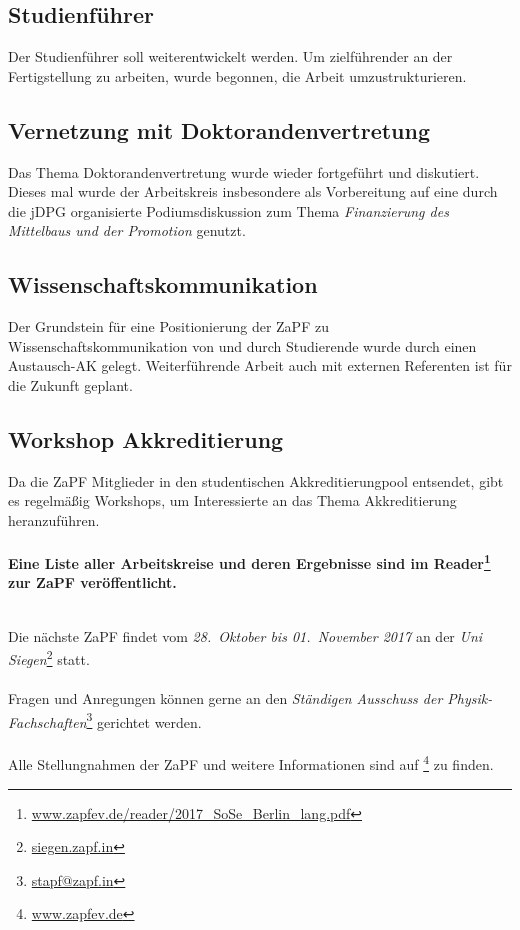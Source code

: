\documentclass[a4paper]{article}
\begin{document}
\subsection*{Studienführer}
Der Studienführer soll weiterentwickelt werden. Um zielführender an der Fertigstellung zu arbeiten, wurde begonnen, die Arbeit umzustrukturieren.

\subsection*{Vernetzung mit Doktorandenvertretung}
Das Thema Doktorandenvertretung wurde wieder fortgeführt und diskutiert. Dieses mal wurde der Arbeitskreis insbesondere als Vorbereitung auf eine durch die jDPG organisierte Podiumsdiskussion zum Thema \emph{Finanzierung des Mittelbaus und der Promotion} genutzt.

\subsection*{Wissenschaftskommunikation}
Der Grundstein für eine Positionierung der ZaPF zu Wissenschaftskommunikation von und durch Studierende wurde durch einen Austausch-AK gelegt. Weiterführende Arbeit auch mit externen Referenten ist für die Zukunft geplant.

\subsection*{Workshop Akkreditierung}
Da die ZaPF Mitglieder in den studentischen Akkreditierungpool entsendet, gibt es regelmäßig Workshops, um Interessierte an das Thema Akkreditierung heranzuführen.\\
\\
\textbf{
Eine Liste aller Arbeitskreise und deren Ergebnisse sind im
Reader\footnote{\href{http://www.zapfev.de/reader/2017_SoSe_Berlin_lang.pdf}{\url{www.zapfev.de/reader/2017_SoSe_Berlin_lang.pdf}}}
zur ZaPF veröffentlicht.}

        
\vfill
~\\       
Die nächste ZaPF findet vom \emph{28.\ Oktober bis 01.\ November 2017} an der  \emph{Uni Siegen}\footnote{\href{https://siegen.zapf.in/}{\url{siegen.zapf.in}}} statt.
\\
\\
Fragen und Anregungen können gerne an den \emph{Ständigen Ausschuss der Physik-Fachschaften}\footnote{\href{mailto:stapf@zapf.in}{\url{stapf@zapf.in}}} gerichtet werden.
\\
\\
Alle Stellungnahmen der ZaPF und weitere Informationen sind auf \footnote{\href{http://www.zapfev.de}{\url{www.zapfev.de}}} zu finden.
        
        
        
\end{document}

